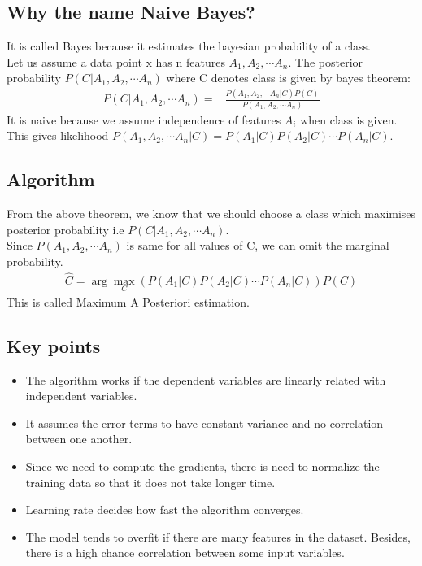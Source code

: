 \documentclass[12pt,letterpaper, onecolumn]{exam}
\begin{document}
\subsection*{Why the name Naive Bayes?}
It is called Bayes because it estimates the bayesian probability of a class.\\
Let us assume a data point x has n features $A_1, A_2,\cdots A_n$. The posterior probability $P(C|A_1, A_2,\cdots A_n)$ where C denotes class is given by bayes theorem:
\begin{align}
P(C|A_1, A_2,\cdots A_n) = {}& \frac{P(A_1, A_2,\cdots A_n |C) P(C)}{P(A_1, A_2,\cdots A_n)}
\end{align}
It is naive because we assume independence of features $A_i$ when class is given.\\
This gives likelihood $P(A_1, A_2,\cdots A_n |C) = P(A_1|C) P(A_2|C) \cdots P(A_n|C)$.

\subsection*{Algorithm}
From the above theorem, we know that we should choose a class which maximises posterior probability i.e $P(C|A_1, A_2,\cdots A_n)$. \\
Since $P(A_1, A_2,\cdots A_n)$ is same for all values of C, we can omit the marginal probability.
\begin{align}
\hat{C} = \arg \max_{C} (P(A_1|C) P(A_2|C) \cdots P(A_n|C))P(C)
\end{align}
This is called Maximum A Posteriori estimation.


\subsection*{Key points}
\begin{itemize}
\item The algorithm works if the dependent variables are linearly related with independent variables.
\item It assumes the error terms to have constant variance and no correlation between one another.
\item Since we need to compute the gradients, there is need to normalize the training data so that it does not take longer time.
\item Learning rate decides how fast the algorithm converges.
\item The model tends to overfit if there are many features in the dataset. Besides, there is a high chance correlation between some input variables.
\end{itemize}
\end{document}
